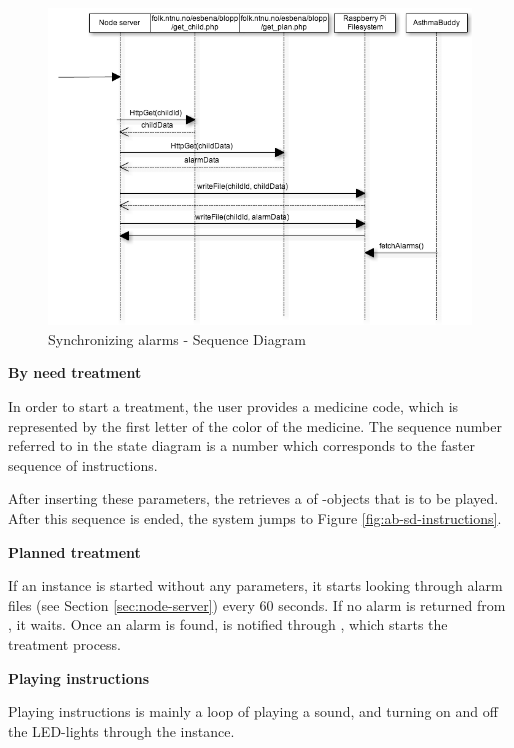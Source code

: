 \begin{figure}
	\centering
		\includegraphics[scale=0.6]{Pictures/sd/sd-synchronizingv2.png}
	\caption{Synchronizing alarms - Sequence Diagram}
	\label{fig:ab-sd-synchronizing}
\end{figure}

\textbf{By need treatment}

In order to start a treatment, the user provides a medicine code, which is represented by the first letter of the color of the medicine. The sequence number referred to in the state diagram is a number which corresponds to the faster sequence of instructions. 

After inserting these parameters, the  retrieves a  of -objects that is to be played. After this sequence is ended, the system jumps to Figure \ref{fig:ab-sd-instructions}.
 
\textbf{Planned treatment}

If an  instance is started without any parameters, it starts looking through alarm files (see Section \ref{sec:node-server}) every 60 seconds. If no alarm is returned from , it waits. Once an alarm is found,  is notified through , which starts the treatment process. 
 
\textbf{Playing instructions}

Playing instructions is mainly a loop of playing a sound, and turning on and off the LED-lights through the  instance. 

